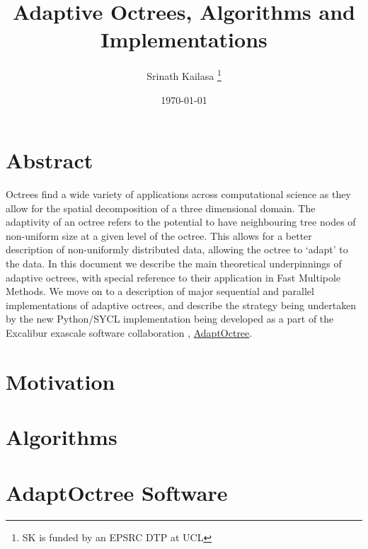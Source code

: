 \documentclass[12pt, a4, twoside]{article}
\title{Adaptive Octrees, Algorithms and Implementations}
\author{Srinath Kailasa \thanks{SK is funded by an EPSRC DTP at UCL}}
\date{\today}
\begin{document}
\maketitle

\section*{Abstract}

Octrees find a wide variety of applications across computational science as they
allow for the spatial decomposition of a three dimensional domain. The adaptivity of
an octree refers to the potential to have neighbouring tree nodes of non-uniform
size at a given level of the octree. This allows for a better description of
non-uniformly distributed data, allowing the octree to `adapt' to the data. In this
document we describe the main theoretical underpinnings of adaptive octrees, with
special reference to their application in Fast Multipole Methods. We move on to
a description of major sequential and parallel implementations of adaptive octrees,
and describe the strategy being undertaken by the new Python/SYCL implementation
being developed as a part of the Excalibur exascale software collaboration \cite{excalibur},
\href{https://github.com/Excalibur-SLE/AdaptOctree}{AdaptOctree}.

\cite{Sundar:2008:SIAM}

\section*{Motivation}


\section*{Algorithms}


\section*{AdaptOctree Software}


\printbibliography
\end{document}
